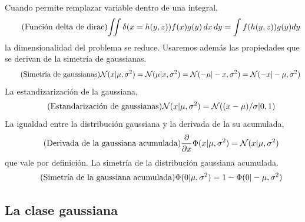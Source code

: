 \documentclass[a4paper,11pt]{book}
\newcommand{\N}{\mathcal{N}}
\theoremstyle{definition}
\begin{document}
%
Cuando permite remplazar variable dentro de una integral,
%
\begin{equation*}\label{eq:integral_con_dirac} \tag{\text{Funci\'on delta de dirac}}
\begin{split}
 \iint  \delta(x=h(y,z)) f(x) g(y)\, dx\, dy = \int f(h(y,z)) g(y) dy
 \end{split}
\end{equation*}
%
la dimensionalidad del problema se reduce.
%
Usaremos adem\'as las propiedades que se derivan de la simetr\'ia de gaussianas.
%
\begin{equation*}\label{eq:simetria} \tag{\text{Simetr\'ia de gaussianas}}
 \N(x|\mu,\sigma^2) = \N(\mu|x,\sigma^2) = \N(-\mu|-x,\sigma^2) = \N(-x|-\mu,\sigma^2)
\end{equation*}
%
La estandizarizaci\'on de la gaussiana,
\begin{equation*}\label{eq:estandarizar} \tag{\text{Estandarizaci\'on de gaussianas}}
  \N(x|\mu,\sigma^2) = \N((x-\mu)/\sigma | 0, 1)
\end{equation*}
%
La igualdad entre la distribuci\'on gaussiana y la derivada de la su acumulada,
\begin{equation*}\label{eq:phi_norm} \tag{\text{Derivada de la gaussiana acumulada}}
 \frac{\partial}{\partial x} \Phi(x|\mu,\sigma^2) = \N(x|\mu,\sigma^2)
\end{equation*}
%
que vale por definici\'on.
%
La simetr\'ia de la distribuci\'on gaussiana acumulada.
\begin{equation*}\label{eq:phi_simetria} \tag{\text{Simetr\'ia de la gaussiana acumulada}}
\Phi(0|\mu,\sigma^2) = 1-\Phi(0|-\mu,\sigma^2)
\end{equation*}

\subsection{La clase gaussiana}\label{sec:Gaussian}
\end{document}
